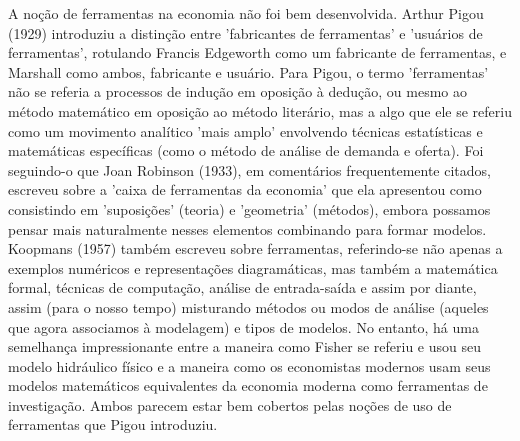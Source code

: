 \documentclass[12pt]{article}
\begin{document}
A noção de ferramentas na economia não foi bem desenvolvida. Arthur Pigou (1929) introduziu a distinção entre 'fabricantes de ferramentas' e 'usuários de ferramentas', rotulando Francis Edgeworth como um fabricante de ferramentas, e Marshall como ambos, fabricante e usuário. Para Pigou, o termo 'ferramentas' não se referia a processos de indução em oposição à dedução, ou mesmo ao método matemático em oposição ao método literário, mas a algo que ele se referiu como um movimento analítico 'mais amplo' envolvendo técnicas estatísticas e matemáticas específicas (como o método de análise de demanda e oferta). Foi seguindo-o que Joan Robinson (1933), em comentários frequentemente citados, escreveu sobre a 'caixa de ferramentas da economia' que ela apresentou como consistindo em 'suposições' (teoria) e 'geometria' (métodos), embora possamos pensar mais naturalmente nesses elementos combinando para formar modelos. Koopmans (1957) também escreveu sobre ferramentas, referindo-se não apenas a exemplos numéricos e representações diagramáticas, mas também a matemática formal, técnicas de computação, análise de entrada-saída e assim por diante, assim (para o nosso tempo) misturando métodos ou modos de análise (aqueles que agora associamos à modelagem) e tipos de modelos. No entanto, há uma semelhança impressionante entre a maneira como Fisher se referiu e usou seu modelo hidráulico físico e a maneira como os economistas modernos usam seus modelos matemáticos equivalentes da economia moderna como ferramentas de investigação. Ambos parecem estar bem cobertos pelas noções de uso de ferramentas que Pigou introduziu.
\end{document}
